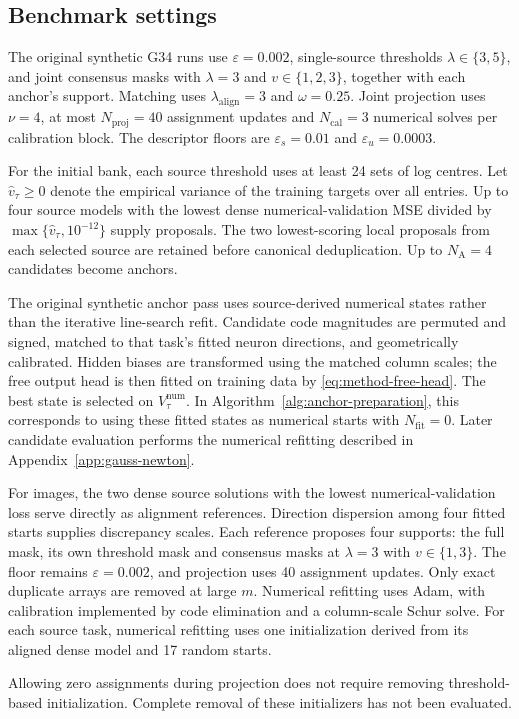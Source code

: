 \subsection{Benchmark settings}
\label{app:bank-benchmark-settings}

The original synthetic G34 runs use $\varepsilon=0.002$,
single-source thresholds $\lambda\in\{3,5\}$, and joint consensus
masks with $\lambda=3$ and $v\in\{1,2,3\}$, together with each
anchor's support. Matching uses $\lambda_{\mathrm{align}}=3$ and
$\omega=0.25$. Joint projection uses $\nu=4$, at most
$N_{\mathrm{proj}}=40$ assignment updates and
$N_{\mathrm{cal}}=3$ numerical solves per calibration block.
The descriptor floors are $\varepsilon_s=0.01$ and
$\varepsilon_u=0.0003$.

For the initial bank, each source threshold uses at least 24 sets of
log centres. Let $\widehat v_\tau\ge0$ denote the empirical variance
of the training targets over all entries. Up to four source models
with the lowest dense numerical-validation MSE divided by
$\max\{\widehat v_\tau,10^{-12}\}$ supply proposals. The two
lowest-scoring local proposals from each selected source are retained
before canonical deduplication. Up to $N_{\mathrm A}=4$ candidates
become anchors.

The original synthetic anchor pass uses source-derived numerical
states rather than the iterative line-search refit. Candidate code
magnitudes are permuted and signed, matched to that task's fitted
neuron directions, and geometrically calibrated. Hidden biases are
transformed using the matched column scales; the free output head is
then fitted on training data by \eqref{eq:method-free-head}. The best state
is selected on $V_\tau^{\mathrm{num}}$.
In Algorithm~\ref{alg:anchor-preparation}, this corresponds to using
these fitted states as numerical starts with $N_{\mathrm{fit}}=0$.
Later candidate evaluation performs the numerical refitting described
in Appendix~\ref{app:gauss-newton}.

For images, the two dense source solutions with the lowest
numerical-validation loss serve directly as alignment references.
Direction dispersion among four fitted starts supplies discrepancy
scales. Each reference proposes four supports: the full mask, its
own threshold mask and consensus masks at $\lambda=3$ with
$v\in\{1,3\}$. The floor remains $\varepsilon=0.002$, and projection
uses 40 assignment updates. Only exact duplicate arrays are removed
at large $m$. Numerical refitting uses Adam, with calibration
implemented by code elimination and a column-scale Schur solve.
For each source task, numerical refitting uses one initialization
derived from its aligned dense model and 17 random starts.

Allowing zero assignments during projection does not require
removing threshold-based initialization. Complete removal of these
initializers has not been evaluated.
